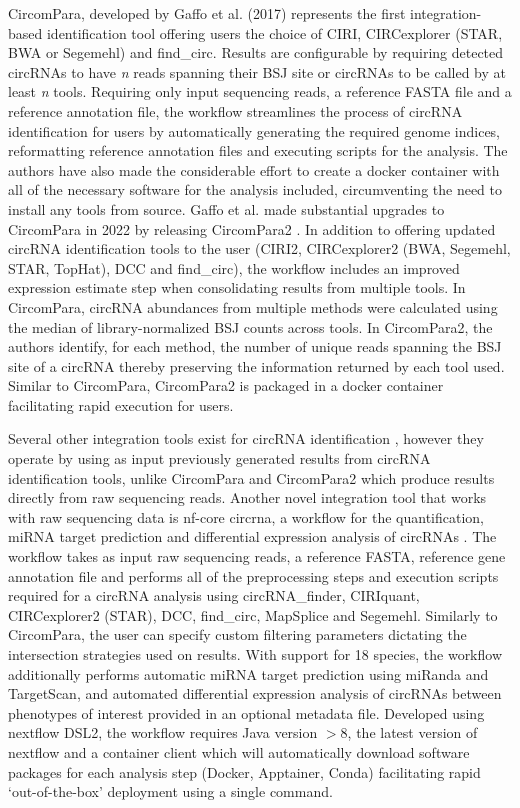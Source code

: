 \documentclass[journal,review,submit,pdftex,moreauthors]{Definitions/mdpi}
\begin{document}
CircomPara, developed by Gaffo et al. (2017) \cite{CirComPara} represents the first integration-based identification tool offering users the choice of CIRI, CIRCexplorer (STAR, BWA or Segemehl) and find\_circ. Results are configurable by requiring detected circRNAs to have \textit{n} reads spanning their BSJ site or circRNAs to be called by at least \textit{n} tools. Requiring only input sequencing reads, a reference FASTA file and a reference annotation file, the workflow streamlines the process of circRNA identification for users by automatically generating the required genome indices, reformatting reference annotation files and executing scripts for the analysis. The authors have also made the considerable effort to create a docker container with all of the necessary software for the analysis included, circumventing the need to install any tools from source. Gaffo et al. made substantial upgrades to CircomPara in 2022 by releasing CircomPara2 \cite{CirComPara2}. In addition to offering updated circRNA identification tools to the user (CIRI2, CIRCexplorer2 (BWA, Segemehl, STAR, TopHat), DCC and find\_circ), the workflow includes an improved expression estimate step when consolidating results from multiple tools. In CircomPara, circRNA abundances from multiple methods were calculated using the median of library-normalized BSJ counts across tools. In CircomPara2, the authors identify, for each method, the number of unique reads spanning the BSJ site of a circRNA thereby preserving the information returned by each tool used. Similar to CircomPara, CircomPara2 is packaged in a docker container facilitating rapid execution for users. \par
Several other integration tools exist for circRNA identification \cite{circRNAwrap, DEBKS, circmeta, circRNAprofiler, FcircSEC}, however they operate by using as input previously generated results from circRNA identification tools, unlike CircomPara and CircomPara2 which produce results directly from raw sequencing reads. Another novel integration tool that works with raw sequencing data is nf-core circrna, a workflow for the quantification, miRNA target prediction and differential expression analysis of circRNAs \cite{Digby2023Dec}. The workflow takes as input raw sequencing reads, a reference FASTA, reference gene annotation file and performs all of the preprocessing steps and execution scripts required for a circRNA analysis using circRNA\_finder, CIRIquant, CIRCexplorer2 (STAR), DCC, find\_circ, MapSplice and Segemehl. Similarly to CircomPara, the user can specify custom filtering parameters dictating the intersection strategies used on results. With support for 18 species, the workflow additionally performs automatic miRNA target prediction using miRanda and TargetScan, and automated differential expression analysis of circRNAs between phenotypes of interest provided in an optional metadata file. Developed using nextflow DSL2, the workflow requires Java version $>$8, the latest version of nextflow and a container client which will automatically download software packages for each analysis step (Docker, Apptainer, Conda) facilitating rapid `out-of-the-box' deployment using a single command.
\end{document}
